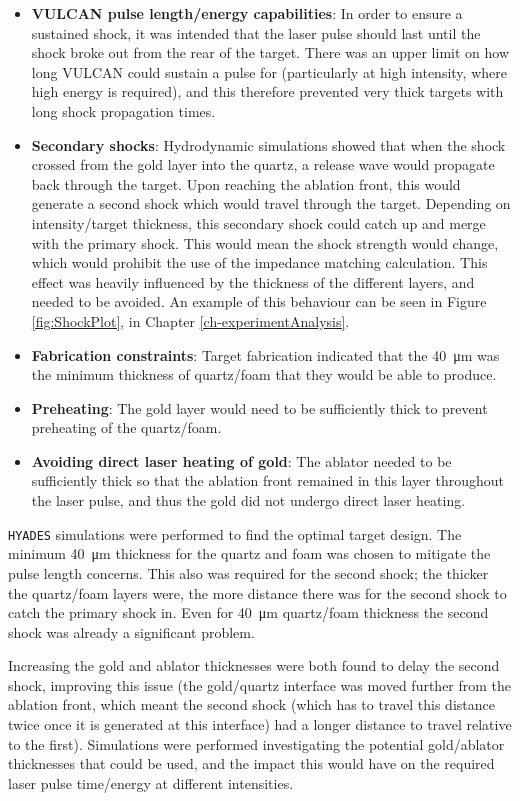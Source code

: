 \begin{itemize}
    \item \textbf{VULCAN pulse length/energy capabilities}: In order to ensure a sustained shock, it was intended that the laser pulse should last until the shock broke out from the rear of the target. There was an upper limit on how long VULCAN could sustain a pulse for (particularly at high intensity, where high energy is required), and this therefore prevented very thick targets with long shock propagation times.
    \item \textbf{Secondary shocks}: Hydrodynamic simulations showed that when the shock crossed from the gold layer into the quartz, a release wave would propagate back through the target. Upon reaching the ablation front, this would generate a second shock which would travel through the target. Depending on intensity/target thickness, this secondary shock could catch up and merge with the primary shock. This would mean the shock strength would change, which would prohibit the use of the impedance matching calculation. This effect was heavily influenced by the thickness of the different layers, and needed to be avoided. An example of this behaviour can be seen in Figure \ref{fig:ShockPlot}, in Chapter \ref{ch-experimentAnalysis}.
    \item \textbf{Fabrication constraints}: Target fabrication indicated that the 40~\unit{\micro\meter} was the minimum thickness of quartz/foam that they would be able to produce.
    \item \textbf{Preheating}: The gold layer would need to be sufficiently thick to prevent preheating of the quartz/foam. 
    \item \textbf{Avoiding direct laser heating of gold}: The ablator needed to be sufficiently thick so that the ablation front remained in this layer throughout the laser pulse, and thus the gold did not undergo direct laser heating.
\end{itemize}

\texttt{HYADES} simulations were performed to find the optimal target design. The minimum 40~\unit{\micro\meter} thickness for the quartz and foam was chosen to mitigate the pulse length concerns. This also was required for the second shock; the thicker the quartz/foam layers were, the more distance there was for the second shock to catch the primary shock in. Even for 40~\unit{\micro\meter} quartz/foam thickness the second shock was already a significant problem. 

Increasing the gold and ablator thicknesses were both found to delay the second shock, improving this issue (the gold/quartz interface was moved further from the ablation front, which meant the second shock (which has to travel this distance twice once it is generated at this interface) had a longer distance to travel relative to the first). Simulations were performed investigating the potential gold/ablator thicknesses that could be used, and the impact this would have on the required laser pulse time/energy at different intensities.

